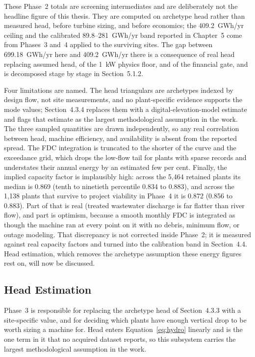 \documentclass[12pt,letterpaper]{report}
\begin{document}
These Phase~2 totals are screening intermediates and are deliberately not the
headline figure of this thesis. They are computed on archetype head rather than
measured head, before turbine sizing, and before economics; the 409.2~GWh/yr
ceiling and the calibrated 89.8--281~GWh/yr band reported in Chapter~5 come from
Phases~3 and~4 applied to the surviving sites. The gap between 699.18~GWh/yr here
and 409.2~GWh/yr there is a consequence of real head replacing assumed head, of
the 1~kW physics floor, and of the financial gate, and is decomposed stage by
stage in Section~5.1.2.

Four limitations are named. The head triangulars are archetypes indexed by
design flow, not site measurements, and no plant-specific evidence supports the
mode values; Section~4.3.4 replaces them with a digital-elevation-model estimate
and flags that estimate as the largest methodological assumption in the work.
The three sampled quantities are drawn independently, so any real correlation
between head, machine efficiency, and availability is absent from the reported
spread. The FDC integration is truncated to the shorter of the curve and the
exceedance grid, which drops the low-flow tail for plants with sparse records and
understates their annual energy by an estimated few per cent. Finally, the
implied capacity factor is implausibly high: across the 5{,}464 retained plants
its median is 0.869 (tenth to ninetieth percentile 0.834 to 0.883), and across
the 1{,}138 plants that survive to project viability in Phase~4 it is 0.872
(0.856 to 0.883). Part of that is real (treated wastewater discharge is far
flatter than river flow), and part is optimism, because a smooth monthly FDC is
integrated as though the machine ran at every point on it with no debris, minimum
flow, or outage modeling. That discrepancy is
not corrected inside Phase~2; it is measured against real capacity factors and
turned into the calibration band in Section~4.4. Head estimation, which removes
the archetype assumption these energy figures rest on, will now be discussed.
\subsection{Head Estimation}

Phase~3 is responsible for replacing the archetype head of Section~4.3.3 with a
site-specific value, and for deciding which plants have enough vertical drop to
be worth sizing a machine for. Head enters Equation~\eqref{eq:hydro} linearly and
is the one term in it that no acquired dataset reports, so this subsystem carries
the largest methodological assumption in the work.
\end{document}
